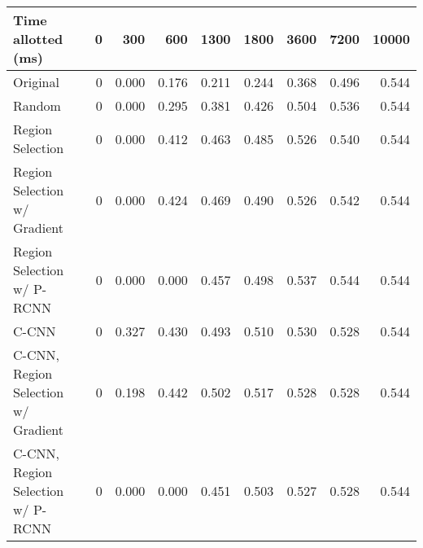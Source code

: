 \begin{tabular}{lrrrrrrrr}
\toprule
Time allotted (ms)                  &  0     &  300   &  600   &  1300  &  1800  &  3600  &  7200  &  10000 \\
\midrule
Original                            &  0 &  0.000 &  0.176 &  0.211 &  0.244 &  0.368 &  0.496 &  0.544 \\
Random                              &  0 &  0.000 &  0.295 &  0.381 &  0.426 &  0.504 &  0.536 &  0.544 \\
Region Selection                    &  0 &  0.000 &  0.412 &  0.463 &  0.485 &  0.526 &  0.540 &  0.544 \\
Region Selection w/ Gradient        &  0 &  0.000 &  0.424 &  0.469 &  0.490 &  0.526 &  0.542 &  0.544 \\
Region Selection w/ P-RCNN          &  0 &  0.000 &  0.000 &  0.457 &  0.498 &  0.537 &  0.544 &  0.544 \\
C-CNN                               &  0 &  0.327 &  0.430 &  0.493 &  0.510 &  0.530 &  0.528 &  0.544 \\
C-CNN, Region Selection w/ Gradient &  0 &  0.198 &  0.442 &  0.502 &  0.517 &  0.528 &  0.528 &  0.544 \\
C-CNN, Region Selection w/ P-RCNN   &  0 &  0.000 &  0.000 &  0.451 &  0.503 &  0.527 &  0.528 &  0.544 \\
\bottomrule
\end{tabular}
